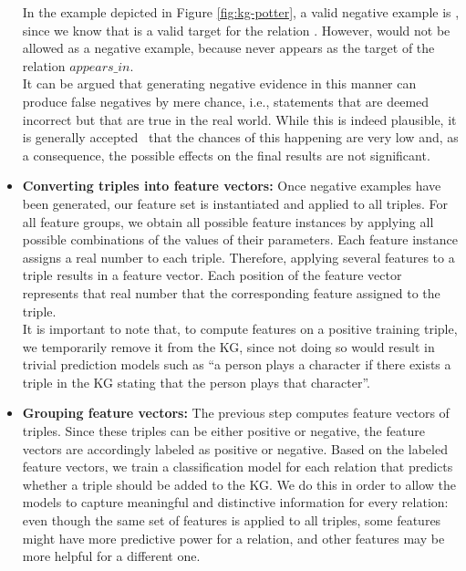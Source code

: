 \begin{itemize}
    In the example depicted in Figure \ref{fig:kg-potter}, a valid negative example is , since we know that  is a valid target for the relation . However,  would not be allowed as a negative example, because  never appears as the target of the relation $appears\_in$.\\
    
    It can be argued that generating negative evidence in this manner can produce false negatives by mere chance, i.e., statements that are deemed incorrect but that are true in the real world. While this is indeed plausible, it is generally accepted~\cite{ji2015, lin2015, socher2013} that the chances of this happening are very low and, as a consequence, the possible effects on the final results are not significant.\\

    \item \textbf{Converting triples into feature vectors:} Once negative examples have been generated, our feature set is instantiated and applied to all triples. For all feature groups, we obtain all possible feature instances by applying all possible combinations of the values of their parameters. Each feature instance assigns a real number to each triple. Therefore, applying several features to a triple results in a feature vector. Each position of the feature vector represents that real number that the corresponding feature assigned to the triple.\\

    It is important to note that, to compute features on a positive training triple, we temporarily remove it from the KG, since not doing so would result in trivial prediction models such as ``a person plays a character if there exists a triple in the KG stating that the person plays that character''.\\\newpage

    \item \textbf{Grouping feature vectors:} The previous step computes feature vectors of triples. Since these triples can be either positive or negative, the feature vectors are accordingly labeled as positive or negative. Based on the labeled feature vectors, we train a classification model for each relation that predicts whether a triple should be added to the KG. We do this in order to allow the models to capture meaningful and distinctive information for every relation: even though the same set of features is applied to all triples, some features might have more predictive power for a relation, and other features may be more helpful for a different one.\\
    

\end{itemize}

